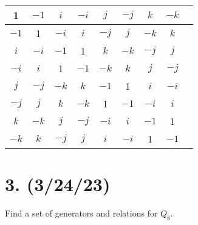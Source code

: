 \documentclass{article}
\begin{document}
\begin{center}
    \begin{tabular}{ |c|c|c|c|c|c|c|c|c| } 
        \hline
        1 & $-1$ & $i$ & $-i$ & $j$ & $-j$ & $k$ & $-k$ \\
        \hline
        $-1$ & 1 & $-i$ & $i$ & $-j$ & $j$ & $-k$ & $k$ \\
        \hline
        $i$ & $-i$ & $-1$ & 1 & $k$ & $-k$ & $-j$ & $j$ \\
        \hline
        $-i$ & $i$ & 1 & $-1$ & $-k$ & $k$ & $j$ & $-j$ \\
        \hline
        $j$ & $-j$ & $-k$ & $k$ & $-1$ & 1 & $i$ & $-i$ \\
        \hline
        $-j$ & $j$ & $k$ & $-k$ & 1 & $-1$ & $-i$ & $i$ \\
        \hline
        $k$ & $-k$ & $j$ & $-j$ & $-i$ & $i$ & $-1$ & 1 \\
        \hline
        $-k$ & $k$ & $-j$ & $j$ & $i$ & $-i$ & 1 & $-1$ \\
        \hline
    \end{tabular}
\end{center}

\section*{3. (3/24/23)}

Find a set of generators and relations for $Q_8$.
\end{document}
